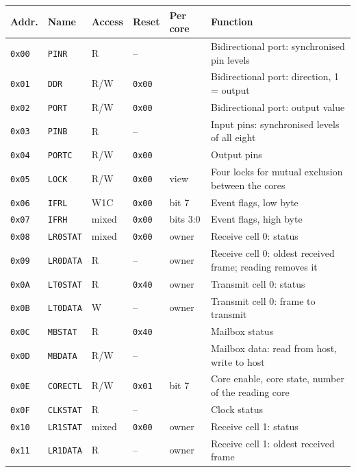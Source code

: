 \documentclass[10pt,a4paper]{article}
\newcommand{\reg}[1]{\texttt{#1}}
\begin{document}
\begin{table}[H]
\centering\small
\begin{tabularx}{\linewidth}{@{}lllllL@{}}
\toprule
Addr. & Name & Access & Reset & Per core & Function \\
\midrule
\texttt{0x00} & \reg{PINR} & R & -- & & Bidirectional port: synchronised pin levels \\
\texttt{0x01} & \reg{DDR} & R/W & \texttt{0x00} & & Bidirectional port: direction, 1 = output \\
\texttt{0x02} & \reg{PORT} & R/W & \texttt{0x00} & & Bidirectional port: output value \\
\texttt{0x03} & \reg{PINB} & R & -- & & Input pins: synchronised levels of all eight \\
\texttt{0x04} & \reg{PORTC} & R/W & \texttt{0x00} & & Output pins \\
\texttt{0x05} & \reg{LOCK} & R/W & \texttt{0x00} & view & Four locks for mutual exclusion between the cores \\
\texttt{0x06} & \reg{IFRL} & W1C & \texttt{0x00} & bit 7 & Event flags, low byte \\
\texttt{0x07} & \reg{IFRH} & mixed & \texttt{0x00} & bits 3:0 & Event flags, high byte \\
\texttt{0x08} & \reg{LR0STAT} & mixed & \texttt{0x00} & owner & Receive cell 0: status \\
\texttt{0x09} & \reg{LR0DATA} & R & -- & owner & Receive cell 0: oldest received frame; reading removes it \\
\texttt{0x0A} & \reg{LT0STAT} & R & \texttt{0x40} & owner & Transmit cell 0: status \\
\texttt{0x0B} & \reg{LT0DATA} & W & -- & owner & Transmit cell 0: frame to transmit \\
\texttt{0x0C} & \reg{MBSTAT} & R & \texttt{0x40} & & Mailbox status \\
\texttt{0x0D} & \reg{MBDATA} & R/W & -- & & Mailbox data: read from host, write to host \\
\texttt{0x0E} & \reg{CORECTL} & R/W & \texttt{0x01} & bit 7 & Core enable, core state, number of the reading core \\
\texttt{0x0F} & \reg{CLKSTAT} & R & -- & & Clock status \\
\midrule
\texttt{0x10} & \reg{LR1STAT} & mixed & \texttt{0x00} & owner & Receive cell 1: status \\
\texttt{0x11} & \reg{LR1DATA} & R & -- & owner & Receive cell 1: oldest received frame \\

\end{tabularx}
\end{table}
\end{document}
